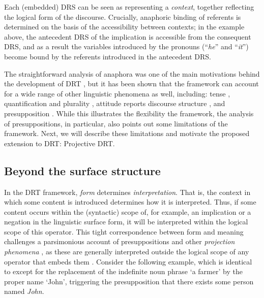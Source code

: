 Each (embedded) DRS can be seen as representing a \textit{context},
together reflecting the logical form of the discourse. Crucially, anaphoric
binding of referents is determined on the basis of the accessibility between
contexts; in the example above, the antecedent DRS of the implication is
accessible from the consequent DRS, and as a result the variables introduced
by the pronouns (``\textit{he}'' and ``\textit{it}'') become bound by the
referents introduced in the antecedent DRS. 

The straightforward analysis of anaphora was one of the main motivations
behind the development of DRT \cite{kamp1981theory,heim1982semantics}, but
it has been shown that the framework can account for a wide range of other
linguistic phenomena as well, including: tense \cite{kamp1981theory},
quantification and plurality \cite{kamp1993discourse}, attitude reports
\cite{asher1986belief,asher1989belief,zeevat1996neoclassical,maier2009presupposing}
discourse structure \cite{asher2003logics}, and presupposition
\cite{sandt1992presupposition,krahmer1998presupposition,geurts1999presuppositions}.
While this illustrates the flexibility the framework, the analysis of
presuppositions, in particular, also points out some limitations of the
framework. Next, we will describe these limitations and motivate the
proposed extension to DRT: Projective DRT.

\subsection{Beyond the surface structure}

In the DRT framework, \textit{form} determines \textit{interpretation}. That
is, the context in which some content is introduced determines how it is
interpreted. Thus, if some content occurs within the (syntactic) scope of,
for example, an implication or a negation in the linguistic surface form, it
will be interpreted within the logical scope of this operator. This tight
correspondence between form and meaning challenges a parsimonious account of
presuppositions and other \textit{projection phenomena}
, as these
are generally interpreted outside the logical scope of any operator that
embeds them .
Consider the following example, which is identical to \Last except for the
replacement of the indefinite noun phrase `a farmer' by the proper name
`John', triggering the presupposition that there exists some person
named \textit{John}.

